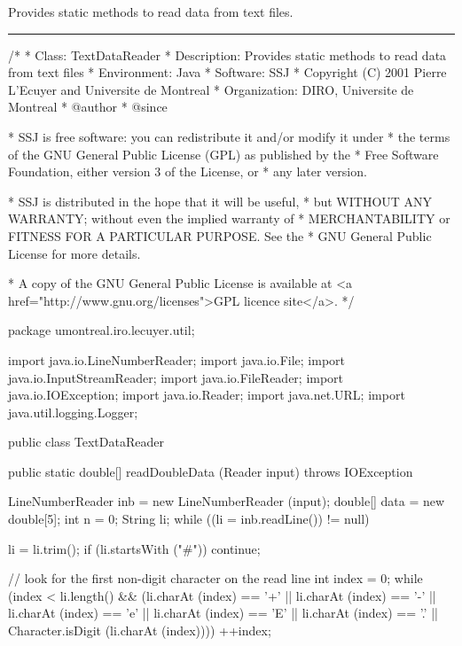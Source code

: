 
Provides static methods to read data from text files.

\bigskip\hrule
\begin{code}
\begin{hide}
/*
 * Class:        TextDataReader
 * Description:  Provides static methods to read data from text files
 * Environment:  Java
 * Software:     SSJ 
 * Copyright (C) 2001  Pierre L'Ecuyer and Universite de Montreal
 * Organization: DIRO, Universite de Montreal
 * @author       
 * @since

 * SSJ is free software: you can redistribute it and/or modify it under
 * the terms of the GNU General Public License (GPL) as published by the
 * Free Software Foundation, either version 3 of the License, or
 * any later version.

 * SSJ is distributed in the hope that it will be useful,
 * but WITHOUT ANY WARRANTY; without even the implied warranty of
 * MERCHANTABILITY or FITNESS FOR A PARTICULAR PURPOSE.  See the
 * GNU General Public License for more details.

 * A copy of the GNU General Public License is available at
   <a href="http://www.gnu.org/licenses">GPL licence site</a>.
 */
\end{hide}
package umontreal.iro.lecuyer.util;\begin{hide}

import java.io.LineNumberReader;
import java.io.File;
import java.io.InputStreamReader;
import java.io.FileReader;
import java.io.IOException;
import java.io.Reader;
import java.net.URL;
import java.util.logging.Logger;
\end{hide}


public class TextDataReader\begin{hide} {
   private static Logger log = Logger.getLogger ("umontreal.iro.lecuyer.util");
\end{hide}

   public static double[] readDoubleData (Reader input) throws IOException\begin{hide} {
      LineNumberReader inb = new LineNumberReader (input);
      double[] data = new double[5];
      int n = 0;
      String li;
      while ((li = inb.readLine()) != null) {
        li = li.trim();
        if (li.startsWith ("#"))
           continue;

         // look for the first non-digit character on the read line
         int index = 0;
         while (index < li.length() &&
            (li.charAt (index) == '+' || li.charAt (index) == '-' ||
             li.charAt (index) == 'e' || li.charAt (index) == 'E' ||
             li.charAt (index) == '.' || Character.isDigit (li.charAt (index))))
           ++index; 

}}
\end{hide}
\end{code}
